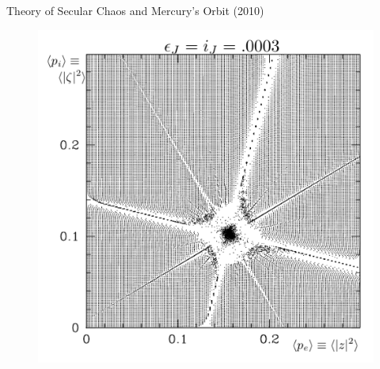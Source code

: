 \documentclass{beamer}
\begin{document}
\begin{frame}{Theory of Secular Chaos and Mercury's Orbit (2010)}
\begin{figure}[h]
\begin{minipage}[h]{0.65\linewidth}
\includegraphics[width=1\linewidth]{./10_1.png}
\end{minipage}
\end{figure}
\end{frame}
\end{document}
